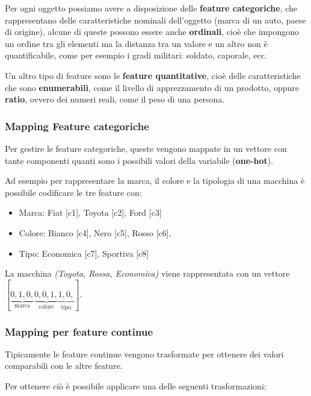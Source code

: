 Per ogni oggetto possiamo avere a disposizione delle \textbf{feature categoriche}, che rappresentano delle caratteristiche nominali
dell'oggetto (marca di un auto, paese di origine), alcune di queste
possono essere anche \textbf{ordinali}, cioè che impongono un ordine tra
gli elementi ma la distanza tra un valore e un altro non è
quantificabile, come per esempio i gradi militari: soldato, caporale,
ecc.

Un altro tipo di feature sono le \textbf{feature quantitative}, cioè
delle caratteristiche che sono \textbf{enumerabili}, come il livello di
apprezzamento di un prodotto, oppure \textbf{ratio}, ovvero dei numeri
reali, come il peso di una persona.

\subsubsection{Mapping Feature categoriche}\label{mapping-feature-categoriche}

Per gestire le feature categoriche, queste vengono mappate in un vettore con tante
componenti quanti sono i possibili valori della variabile (\textbf{one-hot}).

Ad esempio per rappresentare la marca, il colore e la tipologia di una macchina è possibile codificare le tre feature con:

\begin{itemize}
\item
  Marca: Fiat {[}c1{]}, Toyota {[}c2{]}, Ford {[}c3{]}
\item
  Colore: Bianco {[}c4{]}, Nero {[}c5{]}, Rosso {[}c6{]},
\item
  Tipo: Economica {[}c7{]}, Sportiva {[}c8{]}
\end{itemize}

La macchina\textit{ (Toyota, Rossa, Economica)} viene rappresentata con un
vettore $ [ \underbrace{0,1,0,}_{\text{marca}} \underbrace{0,0,1,}_{\text{colore}} \underbrace{1,0,}_{\text{tipo}}]$.


\subsubsection{Mapping per feature continue}\label{mapping-per-feature-continue}

Tipicamente le feature continue vengono trasformate per ottenere dei valori comparabili con le altre feature.

Per ottenere ciò è possibile applicare una delle seguenti trasformazioni:

